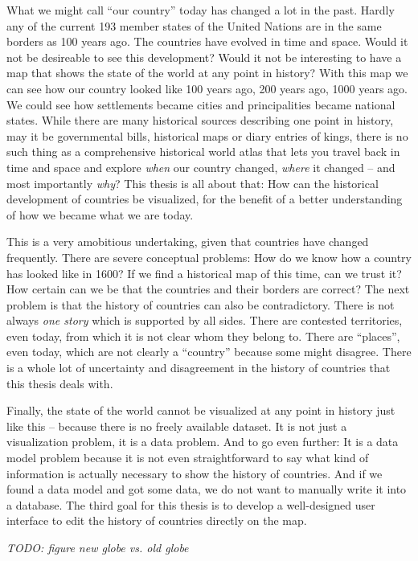 What we might call ``our country'' today has changed a lot in the past. Hardly any of the current 193 member states of the United Nations are in the same borders as 100 years ago. The countries have evolved in time and space. Would it not be desireable to see this development? Would it not be interesting to have a map that shows the state of the world at any point in history? With this map we can see how our country looked like 100 years ago, 200 years ago, 1000 years ago. We could see how settlements became cities and principalities became national states. While there are many historical sources describing one point in history, may it be governmental bills, historical maps or diary entries of kings, there is no such thing as a comprehensive historical world atlas that lets you travel back in time and space and explore \emph{when} our country changed, \emph{where} it changed -- and most importantly \emph{why}? This thesis is all about that: How can the historical development of countries be visualized, for the benefit of a better understanding of how we became what we are today.

This is a very amobitious undertaking, given that countries have changed frequently. There are severe conceptual problems: How do we know how a country has looked like in 1600? If we find a historical map of this time, can we trust it? How certain can we be that the countries and their borders are correct? The next problem is that the history of countries can also be contradictory. There is not always \emph{one story} which is supported by all sides. There are contested territories, even today, from which it is not clear whom they belong to. There are ``places'', even today, which are not clearly a ``country'' because some might disagree. There is a whole lot of uncertainty and disagreement in the history of countries that this thesis deals with.

Finally, the state of the world cannot be visualized at any point in history just like this -- because there is no freely available dataset. It is not just a visualization problem, it is a data problem. And to go even further: It is a data model problem because it is not even straightforward to say what kind of information is actually necessary to show the history of countries. And if we found a data model and got some data, we do not want to manually write it into a database. The third goal for this thesis is to develop a well-designed user interface to edit the history of countries directly on the map.

\vspace{15em}
\emph{TODO: figure new globe vs. old globe}

